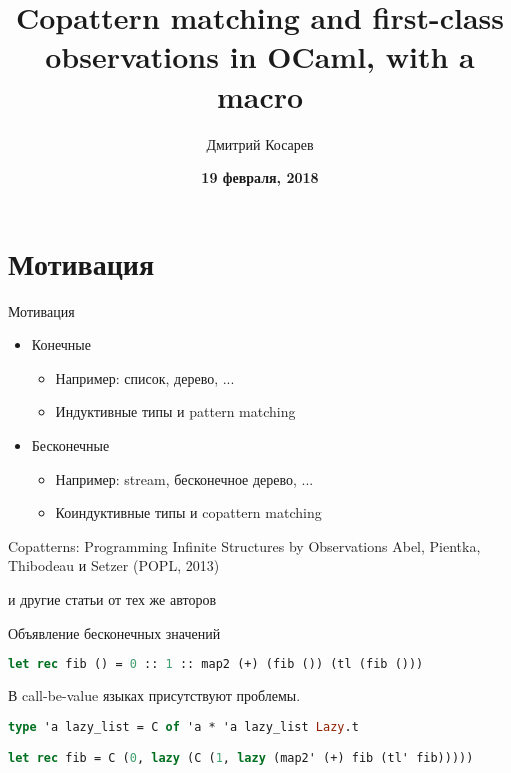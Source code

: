 \documentclass[10pt, mathserif]{beamer}
\title{Copattern matching and first-class observations in OCaml, with a macro}
\author{Дмитрий Косарев}
\date{
  \vskip 2cm
  \small{
    \textbf{19 февраля, 2018}
  }
}
\theoremstyle{definition}
\begin{document}
\begin{frame}
  \titlepage
\end{frame}


\section{Мотивация}

\begin{frame}{Мотивация}
 
\begin{itemize}
  \item Конечные
  \begin{itemize}
    \item Например: список, дерево, ...
    \item Индуктивные типы и pattern matching
  \end{itemize}
  \item Бесконечные
  \begin{itemize}
    \item Например: stream, бесконечное дерево, ...
    \item Коиндуктивные типы и copattern matching
  \end{itemize}
  \vspace{1in}
\end{itemize}
\pause
Copatterns: Programming Infinite Structures by Observations
Abel, Pientka, Thibodeau и Setzer (POPL, 2013)

и другие статьи от тех же авторов
\end{frame}

\begin{frame}[fragile]{Объявление бесконечных значений}

\begin{lstlisting}[language=ocaml,mathescape=true]
let rec fib () = 0 :: 1 :: map2 (+) (fib ()) (tl (fib ()))
\end{lstlisting}
В call-be-value языках присутствуют проблемы.
\pause
\begin{lstlisting}[language=ocaml,mathescape=true]
type 'a lazy_list = C of 'a * 'a lazy_list Lazy.t

let rec fib = C (0, lazy (C (1, lazy (map2' (+) fib (tl' fib)))))

\end{lstlisting}
\end{frame}
\end{document}
